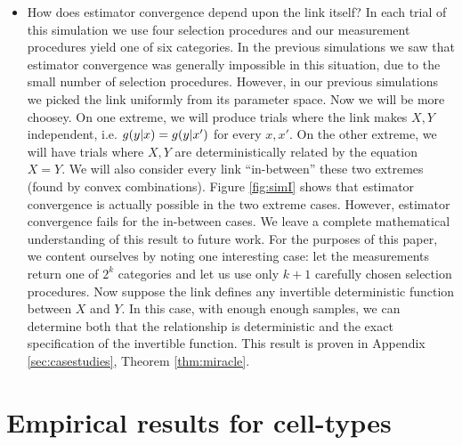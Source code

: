 \begin{itemize}
    \item How does estimator convergence depend upon the link itself?  In each trial of this simulation we use four selection procedures and our measurement procedures yield one of six categories.  In the previous simulations we saw that estimator convergence was generally impossible in this situation, due to the small number of selection procedures.  However, in our previous simulations we picked the link uniformly from its parameter space.  Now we will be more choosey.   On one extreme, we will produce trials where the link makes $X,Y$ independent, i.e. $g(y|x)=g(y|x')$ for every $x,x'$.  On the other extreme, we will have trials where $X,Y$ are deterministically related by the equation $X=Y$.  We will also consider every link ``in-between'' these two extremes (found by convex combinations).  Figure \ref{fig:simI} shows that estimator convergence is actually possible in the two extreme cases.  However, estimator convergence fails for the in-between cases.  We leave a complete mathematical understanding of this result to future work.  For the purposes of this paper, we content ourselves by noting one interesting case: let the measurements return one of $2^k$ categories and let us use only $k+1$ carefully chosen selection procedures.  Now suppose the link defines any invertible deterministic function between $X$ and $Y$.  In this case, with enough enough samples, we can determine both that the relationship is deterministic and the exact specification of the invertible function.  This result is proven in Appendix \ref{sec:casestudies}, Theorem \ref{thm:miracle}.
\end{itemize}

                                       

\section{Empirical results for cell-types}

